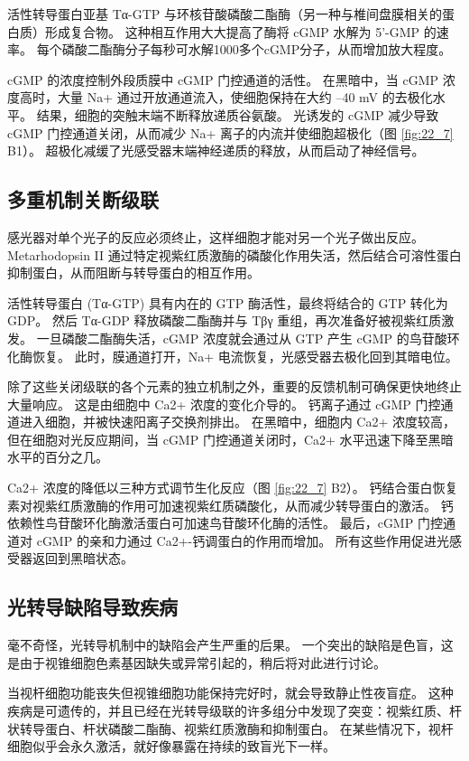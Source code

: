 活性转导蛋白亚基 Tα-GTP 与环核苷酸磷酸二酯酶（另一种与椎间盘膜相关的蛋白质）形成复合物。 
这种相互作用大大提高了酶将 cGMP 水解为 5'-GMP 的速率。 
每个磷酸二酯酶分子每秒可水解1000多个cGMP分子，从而增加放大程度。


cGMP 的浓度控制外段质膜中 cGMP 门控通道的活性。 
在黑暗中，当 cGMP 浓度高时，大量 Na+ 通过开放通道流入，使细胞保持在大约 –40 mV 的去极化水平。 
结果，细胞的突触末端不断释放递质谷氨酸。 
光诱发的 cGMP 减少导致 cGMP 门控通道关闭，从而减少 Na+ 离子的内流并使细胞超极化（图 \ref{fig:22_7} B1）。 
超极化减缓了光感受器末端神经递质的释放，从而启动了神经信号。



\subsection{多重机制关断级联}
感光器对单个光子的反应必须终止，这样细胞才能对另一个光子做出反应。 
Metarhodopsin II 通过特定视紫红质激酶的磷酸化作用失活，然后结合可溶性蛋白抑制蛋白，从而阻断与转导蛋白的相互作用。


活性转导蛋白 (Tα-GTP) 具有内在的 GTP 酶活性，最终将结合的 GTP 转化为 GDP。 
然后 Tα-GDP 释放磷酸二酯酶并与 Tβγ 重组，再次准备好被视紫红质激发。 
一旦磷酸二酯酶失活，cGMP 浓度就会通过从 GTP 产生 cGMP 的鸟苷酸环化酶恢复。 
此时，膜通道打开，Na+ 电流恢复，光感受器去极化回到其暗电位。


除了这些关闭级联的各个元素的独立机制之外，重要的反馈机制可确保更快地终止大量响应。 
这是由细胞中 Ca2+ 浓度的变化介导的。 
钙离子通过 cGMP 门控通道进入细胞，并被快速阳离子交换剂排出。 
在黑暗中，细胞内 Ca2+ 浓度较高，但在细胞对光反应期间，当 cGMP 门控通道关闭时，Ca2+ 水平迅速下降至黑暗水平的百分之几。


Ca2+ 浓度的降低以三种方式调节生化反应（图 \ref{fig:22_7} B2）。 
钙结合蛋白恢复素对视紫红质激酶的作用可加速视紫红质磷酸化，从而减少转导蛋白的激活。 
钙依赖性鸟苷酸环化酶激活蛋白可加速鸟苷酸环化酶的活性。 
最后，cGMP 门控通道对 cGMP 的亲和力通过 Ca2+-钙调蛋白的作用而增加。 
所有这些作用促进光感受器返回到黑暗状态。


\subsection{光转导缺陷导致疾病}
毫不奇怪，光转导机制中的缺陷会产生严重的后果。 
一个突出的缺陷是色盲，这是由于视锥细胞色素基因缺失或异常引起的，稍后将对此进行讨论。


当视杆细胞功能丧失但视锥细胞功能保持完好时，就会导致静止性夜盲症。 
这种疾病是可遗传的，并且已经在光转导级联的许多组分中发现了突变：视紫红质、杆状转导蛋白、杆状磷酸二酯酶、视紫红质激酶和抑制蛋白。
在某些情况下，视杆细胞似乎会永久激活，就好像暴露在持续的致盲光下一样。


